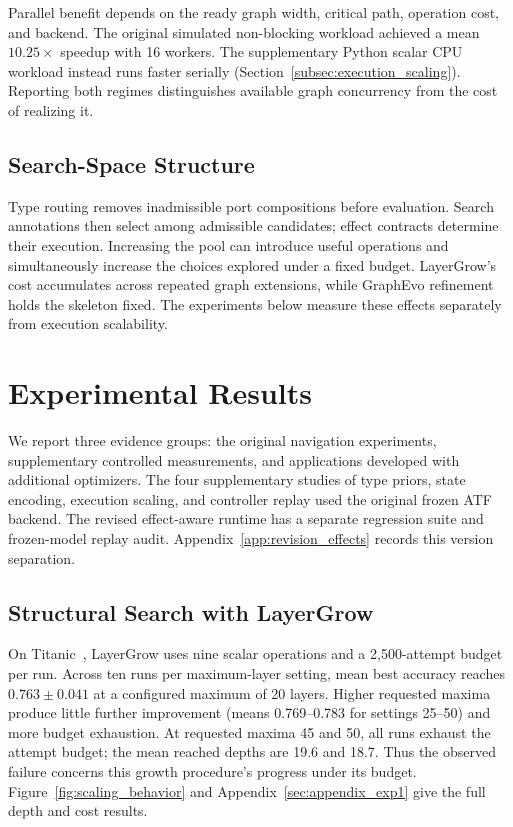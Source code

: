 Parallel benefit depends on the ready graph width, critical path, operation cost, and backend. The original simulated non-blocking workload achieved a mean $10.25\times$ speedup with 16 workers. The supplementary Python scalar CPU workload instead runs faster serially (Section~\ref{subsec:execution_scaling}). Reporting both regimes distinguishes available graph concurrency from the cost of realizing it.

\subsection{Search-Space Structure}
\label{subsec:search_complexity}
Type routing removes inadmissible port compositions before evaluation. Search annotations then select among admissible candidates; effect contracts determine their execution. Increasing the pool can introduce useful operations and simultaneously increase the choices explored under a fixed budget. LayerGrow's cost accumulates across repeated graph extensions, while GraphEvo refinement holds the skeleton fixed. The experiments below measure these effects separately from execution scalability.

\section{Experimental Results}
\label{sec:experiments}
We report three evidence groups: the original navigation experiments, supplementary controlled measurements, and applications developed with additional optimizers. The four supplementary studies of type priors, state encoding, execution scaling, and controller replay used the original frozen ATF backend. The revised effect-aware runtime has a separate regression suite and frozen-model replay audit. Appendix~\ref{app:revision_effects} records this version separation.

\subsection{Structural Search with LayerGrow}
\label{subsec:layergrow_validation}
On Titanic~\cite{titanic}, LayerGrow uses nine scalar operations and a 2,500-attempt budget per run. Across ten runs per maximum-layer setting, mean best accuracy reaches $0.763\pm0.041$ at a configured maximum of 20 layers. Higher requested maxima produce little further improvement (means 0.769--0.783 for settings 25--50) and more budget exhaustion. At requested maxima 45 and 50, all runs exhaust the attempt budget; the mean reached depths are 19.6 and 18.7. Thus the observed failure concerns this growth procedure's progress under its budget. Figure~\ref{fig:scaling_behavior} and Appendix~\ref{sec:appendix_exp1} give the full depth and cost results.


